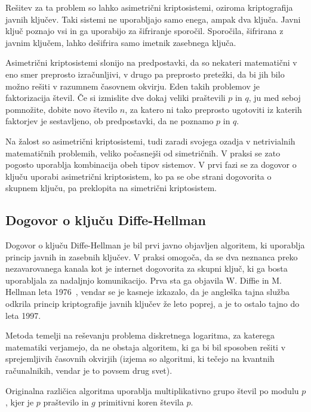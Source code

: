 \documentclass[12pt,a4paper,openany,tikz]{book}
\theoremstyle{plain}
\theoremstyle{definition}
\begin{document}
Rešitev za ta problem so lahko asimetrični kriptosistemi, oziroma kriptografija javnih ključev. Taki sistemi ne uporabljajo samo enega, ampak dva ključa. Javni ključ poznajo vsi in ga uporabijo za šifriranje sporočil. Sporočila, šifrirana z javnim ključem, lahko dešifrira samo imetnik zasebnega ključa.

Asimetrični kriptosistemi slonijo na predpostavki, da so nekateri matematični v eno smer preprosto izračunljivi, v drugo pa preprosto pretežki, da bi jih bilo možno rešiti v razumnem časovnem okvirju. Eden takih problemov je faktorizacija števil. Če si izmislite dve dokaj veliki praštevili $p$ in $q$, ju med seboj pomnožite, dobite novo število $n$, za katero ni tako preprosto ugotoviti iz katerih faktorjev je sestavljeno, ob predpostavki, da ne poznamo $p$ in $q$.

Na žalost so asimetrični kriptosistemi, tudi zaradi svojega ozadja v netrivialnih matematičnih problemih, veliko počasnejši od simetričnih. V praksi se zato pogosto uporablja kombinacija obeh tipov sistemov. V prvi fazi se za dogovor o ključu uporabi asimetrični kriptosistem, ko pa se obe strani dogovorita o skupnem ključu, pa preklopita na simetrični kriptosistem.

\subsection{Dogovor o ključu Diffe-Hellman}
\label{sub:Dogovor o kljucu Diffe-Hellman}

Dogovor o ključu Diffe-Hellman je bil prvi javno objavljen algoritem, ki uporablja princip javnih in zasebnih ključev. V praksi omogoča, da se dva neznanca preko nezavarovanega kanala kot je internet dogovorita za skupni ključ, ki ga bosta uporabljala za nadaljnjo komunikacijo. Prva sta ga objavila W. Diffie in M. Hellman leta 1976~\cite{diffie1976new}, vendar se je kasneje izkazalo, da je angleška tajna služba odkrila princip kriptografije javnih ključev že leto poprej, a je to ostalo tajno do leta 1997.

Metoda temelji na reševanju problema diskretnega logaritma, za katerega matematiki verjamejo, da ne obstaja algoritem, ki ga bi bil sposoben rešiti v sprejemljivih časovnih okvirjih (izjema so algoritmi, ki tečejo na kvantnih računalnikih, vendar je to povsem drug svet).

Originalna različica algoritma uporablja multiplikativno grupo števil po modulu $p$, kjer je $p$ praštevilo in $g$ primitivni koren števila $p$.
\end{document}

